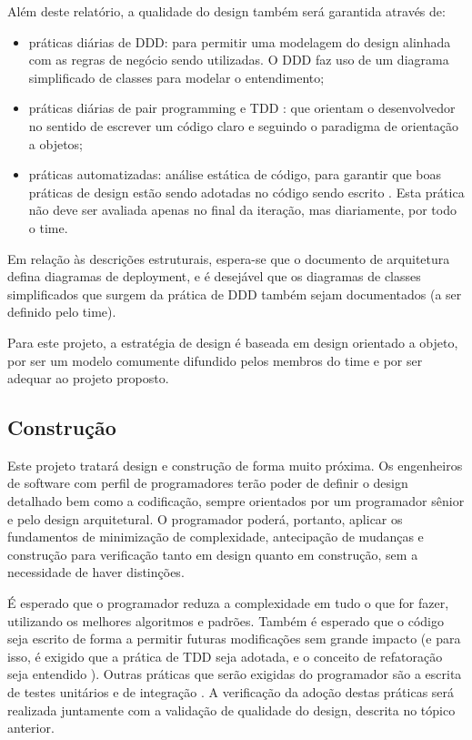 \documentclass[12pt,journal,compsoc]{IEEEtran}
\begin{document}
Além deste relatório, a qualidade do design também será garantida através de:
\begin{itemize}
\item práticas diárias de DDD: para permitir uma modelagem do design alinhada com as regras de negócio sendo utilizadas. O DDD faz uso de um diagrama simplificado de classes para modelar o entendimento;
\item práticas diárias de pair programming e TDD \cite{begel_pair_2008}\cite{nagappan_realizing_2008}: que orientam o desenvolvedor no sentido de escrever um código claro e seguindo o paradigma de orientação a objetos;
\item práticas automatizadas: análise estática de código, para garantir que boas práticas de design estão sendo adotadas no código sendo escrito \cite{karpov_static_code_analysis}. Esta prática não deve ser avaliada apenas no final da iteração, mas diariamente, por todo o time.
\end{itemize}

Em relação às descrições estruturais, espera-se que o documento de arquitetura defina diagramas de deployment, e é desejável que os diagramas de classes simplificados que surgem da prática de DDD também sejam documentados (a ser definido pelo time).

Para este projeto, a estratégia de design é baseada em design orientado a objeto, por ser um modelo comumente difundido pelos membros do time e por ser adequar ao projeto proposto.


\subsection{Construção}

Este projeto tratará design e construção de forma muito próxima. Os engenheiros de software com perfil de programadores terão poder de definir o design detalhado bem como a codificação, sempre orientados por um programador sênior e pelo design arquitetural. O programador poderá, portanto, aplicar os fundamentos de minimização de complexidade, antecipação de mudanças e construção para verificação tanto em design quanto em construção, sem a necessidade de haver distinções.

É esperado que o programador reduza a complexidade em tudo o que for fazer, utilizando os melhores algoritmos e padrões. Também é esperado que o código seja escrito de forma a permitir futuras modificações sem grande impacto (e para isso, é exigido que a prática de TDD seja adotada, e o conceito de refatoração seja entendido \cite{Fowler1999}). Outras práticas que serão exigidas do programador são a escrita de testes unitários e de integração \cite{unit_int_func_testing}. A verificação da adoção destas práticas será realizada juntamente com a validação de qualidade do design, descrita no tópico anterior. 
\end{document}
